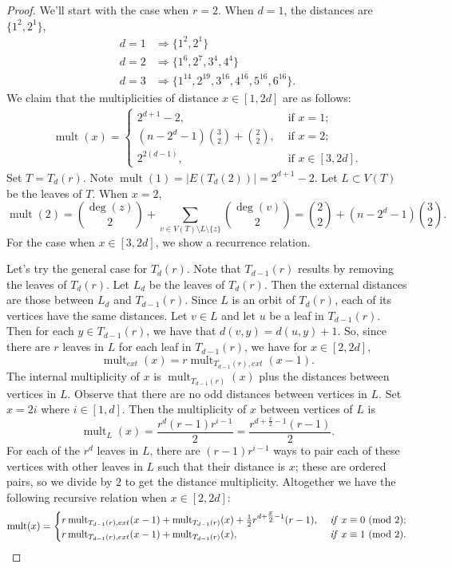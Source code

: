 \documentclass[12]{article}
\newcommand{\Mod}[1]{\ (\mathrm{mod}\ #1)}
\DeclareMathOperator{\mult}{mult}
\theoremstyle{definition}
\begin{document}
	\begin{proof}
		We'll start with the case when $r = 2$.  When $d=1$, the distances are $\{1^2,2^1\}$, 
		\begin{align*}
			d=1 &\Rightarrow \{1^2,2^1\}	\\
			d=2 &\Rightarrow \{1^6, 2^7, 3^4, 4^4\}	\\
			d=3 &\Rightarrow \{1^{14}, 2^{19}, 3^{16}, 4^{16}, 5^{16}, 6^{16}\}.
		\end{align*}
		We claim that the multiplicities of distance $x \in [1,2d]$ are as follows:
		\begin{align*}
			\mult(x) = \begin{cases}
				2^{d+1}-2, 	&\text{ if } x = 1;	\\
				(n-2^d-1){3 \choose 2}+{2 \choose 2}, 	&\text{ if } x = 2;	\\
				2^{2(d-1)},	&\text{ if } x \in [3,2d].
			\end{cases}
		\end{align*}
		Set $T = T_d(r)$.  Note $\mult(1) = |E(T_d(2))| = 2^{d+1}-2$.  Let $L \subset V(T)$ be the leaves of $T$.  When $x=2$, 
		$$\mult(2) = {\deg(z) \choose 2} + \sum_{v \in V(T) \setminus L \setminus \{z\}} {\deg(v) \choose 2} = {2 \choose 2} + (n-2^d-1){3 \choose 2}.$$
		For the case when $x \in [3,2d]$, we show a recurrence relation.
		
		
		
		Let's try the general case for $T_d(r)$.  Note that $T_{d-1}(r)$ results by removing the leaves of $T_d(r)$.  Let $L_d$ be the leaves of $T_d(r)$.  Then the external distances are those between $L_d$ and $T_{d-1}(r)$.  Since $L$ is an orbit of $T_d(r)$, each of its vertices have the same distances.  Let $v \in L$ and let $u$ be a leaf in $T_{d-1}(r)$.  Then for each $y \in T_{d-1}(r)$, we have that $d(v,y) = d(u,y)+1$.  So, since there are $r$ leaves in $L$ for each leaf in $T_{d-1}(r)$, we have for $x \in [2,2d]$,
		$$\mult_{ext}(x) = r\mult_{T_{d-1}(r), ext}(x-1).$$
		The internal multiplicity of $x$ is $\mult_{T_{d-1}(r)}(x)$ plus the distances between vertices in $L$.  Observe that there are no odd distances between vertices in $L$.  Set $x = 2i$ where $i \in [1,d]$.  Then the multiplicity of $x$ between vertices of $L$ is 
		$$\mult_{L}(x) = \frac{r^d(r-1)r^{i-1}}{2} = \frac{r^{d+\tfrac{x}{2} -1}(r-1)}{2}.$$
		For each of the $r^d$ leaves in $L$, there are $(r-1)r^{i-1}$ ways to pair each of these vertices with other leaves in $L$ such that their distance is $x$; these are ordered pairs, so we divide by $2$ to get the distance multiplicity.  Altogether we have the following recursive relation when $x \in [2,2d]$:
		\begin{align*}
			\mult(x) = \begin{cases}
				r\mult_{T_{d-1}(r), ext}(x-1) + \mult_{T_{d-1}(r)}(x) + \tfrac{1}{2}r^{d+\tfrac{x}{2} -1}(r-1), &\text{ \textit{if} } x \equiv 0 \Mod{2}; \\
				r\mult_{T_{d-1}(r), ext}(x-1) + \mult_{T_{d-1}(r)}(x), &\text{ \textit{if} } x \equiv 1 \Mod{2}.
			\end{cases}
		\end{align*}
		

\end{proof}
\end{document}
